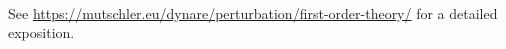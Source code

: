 ~\\See \url{https://mutschler.eu/dynare/perturbation/first-order-theory/} for a detailed exposition.